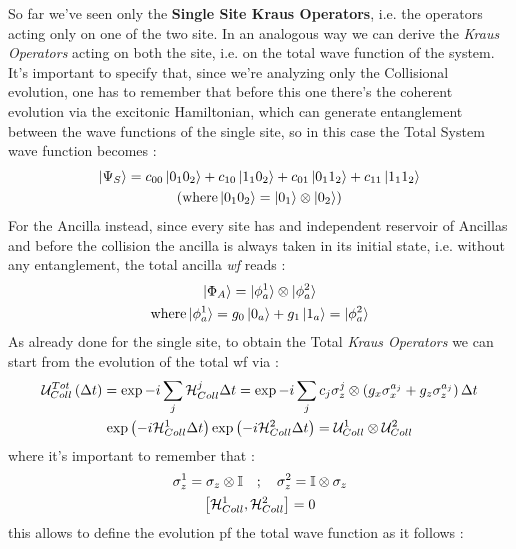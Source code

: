 \documentclass[a4paper,12pt]{article}
\begin{document}
\newpage 
So far we've seen only the \textbf{Single Site Kraus Operators}, i.e. the operators acting only on one of the two site. In an analogous way we can derive the \textit{Kraus Operators} acting on both the site, i.e. on the total wave function of the system. It's important to specify that, since we're analyzing only the Collisional evolution, one has to remember that before this one there's the coherent evolution via the excitonic Hamiltonian, which can generate entanglement between the wave functions of the single site, so in this case the Total System wave function becomes :
\begin{gather}
	\ket{\Psi_{S}} = c_{00} \ket{0_{1}0_{2}} + c_{10} \ket{1_{1}0_{2}} + c_{01} \ket{0_{1}1_{2}} + c_{11} \ket{1_{1}1_{2}} \\
	\left(\text{where}  \ket{0_{1}0_{2}} = \ket{0_{1}} \otimes \ket{0_{2}}\right) \notag
\end{gather}
For the Ancilla instead, since every site has and independent reservoir of Ancillas and before the collision the ancilla is always taken in its initial state, i.e. without any entanglement, the total ancilla \textit{wf} reads :
\begin{gather}
	\ket{\Phi_{A}} = \ket{\phi_{a}^{1}} \otimes \ket{\phi_{a}^{2}} \\
	\text{where} \ket{\phi_{a}^{1}} = g_{0} \ket{0_{a}} + g_{1} \ket{1_{a}} =  \ket{\phi_{a}^{2}} \notag
\end{gather}
As already done for the single site, to obtain the Total \textit{Kraus Operators} we can start from the evolution of the total wf via :
\begin{gather}
	\mathcal{U}_{Coll}^{Tot} \left(\Delta t\right) = \exp{ -i \sum_{j}{\mathcal{H}_{Coll}^{j}} \Delta t } = \exp{-i \sum_{j}{c_{j} \sigma_{z}^{j} \otimes \left( g_{x} \sigma_{x}^{a_{j}} + g_{z} \sigma_{z}^{a_{j}} \right) \Delta t}} \notag \\
	\exp{ \left(-i \mathcal{H}_{Coll}^{1} \Delta t\right) } \exp{ \left(-i \mathcal{H}_{Coll}^{2} \Delta t\right) } = \mathcal{U}_{Coll}^{1} \otimes \mathcal{U}_{Coll}^{2}
\end{gather}
where it's important to remember that :
\begin{gather}
	\sigma_{z}^{1} = \sigma_{z} \otimes \mathbb{I} \quad ; \quad 	\sigma_{z}^{2} = \mathbb{I} \otimes \sigma_{z} \notag \\
	\left[ \mathcal{H}_{Coll}^{1}, \mathcal{H}_{Coll}^{2} \right] = 0
\end{gather}
this allows to define the evolution pf the total wave function as it follows : 
\end{document}
